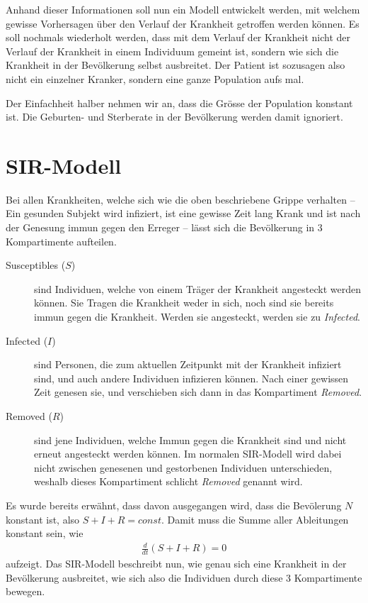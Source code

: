 \begin{refsection}
Anhand dieser Informationen soll nun ein Modell entwickelt werden, mit welchem gewisse Vorhersagen über den Verlauf der Krankheit getroffen werden können. 
Es soll nochmals wiederholt werden, dass mit dem Verlauf der Krankheit nicht der Verlauf der Krankheit in einem Individuum gemeint ist, sondern wie sich die Krankheit in der Bevölkerung selbst ausbreitet. 
Der Patient ist sozusagen also nicht ein einzelner Kranker, sondern eine ganze Population aufs mal.

Der Einfachheit halber nehmen wir an, dass die Grösse der Population konstant ist.
Die Geburten- und Sterberate in der Bevölkerung werden damit ignoriert.

\section{SIR-Modell}
Bei allen Krankheiten, welche sich wie die oben beschriebene Grippe verhalten -- Ein gesunden Subjekt wird infiziert, ist eine gewisse Zeit lang Krank und ist nach der Genesung immun gegen den Erreger -- lässt sich die Bevölkerung in 3 Kompartimente aufteilen. 
\begin{description}
  \item [Susceptibles ($S$)] sind Individuen, welche von einem Träger der Krankheit angesteckt werden können. Sie Tragen die Krankheit weder in sich, noch sind sie bereits immun gegen die Krankheit. Werden sie angesteckt, werden sie zu \emph{Infected}.
  \item [Infected ($I$)] sind Personen, die zum aktuellen Zeitpunkt mit der Krankheit infiziert sind, und auch andere Individuen infizieren können. Nach einer gewissen Zeit genesen sie, und verschieben sich dann in das Kompartiment \emph{Removed}.
  \item [Removed ($R$)] sind jene Individuen, welche Immun gegen die Krankheit sind und nicht erneut angesteckt werden können. Im normalen SIR-Modell wird dabei nicht zwischen genesenen und gestorbenen Individuen unterschieden, weshalb dieses Kompartiment schlicht \emph{Removed} genannt wird.
\end{description}

Es wurde bereits erwähnt, dass davon ausgegangen wird, dass die Bevölerung $N$ konstant ist, also $S + I + R = const$. Damit muss die Summe aller Ableitungen konstant sein, wie
\begin{align*}
  \frac{d}{dt}\left(S+I+R\right) = 0
\end{align*}
aufzeigt. Das SIR-Modell beschreibt nun, wie genau sich eine Krankheit in der Bevölkerung ausbreitet, wie sich also die Individuen durch diese 3 Kompartimente bewegen.


\end{refsection}
